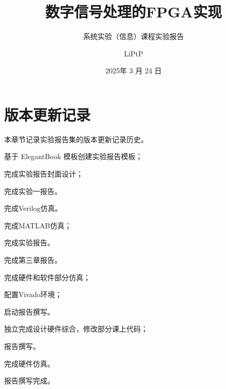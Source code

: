 \documentclass[lang=cn,newtx,10pt,scheme=chinese]{elegantbook}
\title{数字信号处理的FPGA实现}
\subtitle{系统实验（信息）课程实验报告}
\author{LiPtP}
\institute{吴健雄学院}
\date{2025年 3 月 24 日}
\begin{document}
\maketitle
\frontmatter

\tableofcontents

\mainmatter










\appendix
\chapter{版本更新记录}
本章节记录实验报告集的版本更新记录历史。

\begin{change}
  \item 基于 ElegantBook 模板创建实验报告模板；
  \item 完成实验报告封面设计；
  \item 完成实验一报告。
\end{change}

\begin{change}
  \item 完成Verilog仿真。
\end{change}

\begin{change}
\item 完成MATLAB仿真；
\item 完成实验报告。
\end{change}

\begin{change}
\item 完成第三章报告。
\end{change}

\begin{change}
\item 完成硬件和软件部分仿真；
\item 配置Vivado环境；
\item 启动报告撰写。
\end{change}

\begin{change}
\item 独立完成设计硬件综合，修改部分课上代码；
\item 报告撰写。
\end{change}

\begin{change}
  \item 完成硬件仿真。
  \item 报告撰写完成。
\end{change}
\end{document}
